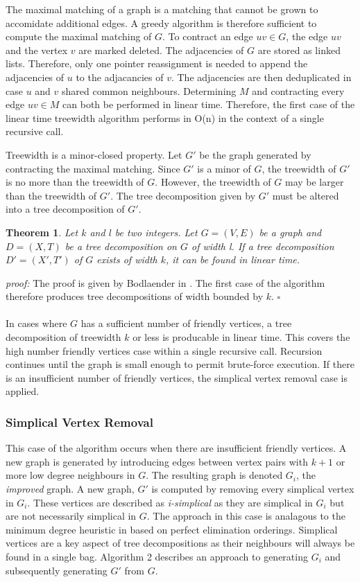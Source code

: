 \documentclass[12pt,conference]{IEEEtran}
\theoremstyle{plain}
\newtheorem{theorem}{Theorem}
\begin{document}
The maximal matching of a graph is a matching that cannot be grown to accomidate additional edges. A greedy algorithm is therefore sufficient to compute the maximal matching of $G$. To contract an edge $uv \in G$, the edge $uv$ and the vertex $v$ are marked deleted. The adjacencies of $G$ are stored as linked lists. Therefore, only one pointer reassignment is needed to append the adjacencies of $u$ to the adjacancies of $v$. The adjacencies are then deduplicated in case $u$ and $v$ shared common neighbours. Determining $M$ and contracting every edge $uv \in M$ can both be performed in linear time. Therefore, the first case of the linear time treewidth algorithm performs in O(n) in the context of a single recursive call.

Treewidth is a minor-closed property. Let $G'$ be the graph generated by contracting the maximal matching. Since $G'$ is a minor of $G$, the treewidth of $G'$ is no more than the treewidth of $G$. However, the treewidth of $G$ may be larger than the treewidth of $G'$. The tree decomposition given by $G'$ must be altered into a tree decomposition of $G'$. 

\begin{theorem}
  Let $k$ and $l$ be two integers. Let $G=(V,E)$ be a graph and $D=(X,T)$ be a tree decomposition on $G$ of width l. If a tree decomposition $D'=(X',T')$ of $G$ exists of width $k$, it can be found in linear time.
\end{theorem}

\textit{proof:} The proof is given by Bodlaender in \cite{treewidth-value-reduction}. The first case of the algorithm therefore produces tree decompositions of width bounded by $k$. $\square$
\\
\\
In cases where $G$ has a sufficient number of friendly vertices, a tree decomposition of treewidth $k$ or less is producable in linear time. This covers the high number friendly vertices case within a single recursive call. Recursion continues until the graph is small enough to permit brute-force execution. If there is an insufficient number of friendly vertices, the simplical vertex removal case is applied.

\subsubsection{Simplical Vertex Removal}

This case of the algorithm occurs when there are insufficient friendly vertices. A new graph is generated by introducing edges between vertex pairs with $k+1$ or more low degree neighbours in $G$. The resulting graph is denoted $G_{i}$, the \textit{improved} graph. A new graph, $G'$ is computed by removing every simplical vertex in $G_{i}$. These vertices are described as \textit{i-simplical} as they are simplical in $G_{i}$ but are not necessarily simplical in $G$. The approach in this case is analagous to the minimum degree heuristic in \cite{min-degree-upper-bound} based on perfect elimination orderings. Simplical vertices are a key aspect of tree decompositions as their neighbours will always be found in a single bag. Algorithm 2 describes an approach to generating $G_{i}$ and subsequently generating $G'$ from $G$.
\end{document}
